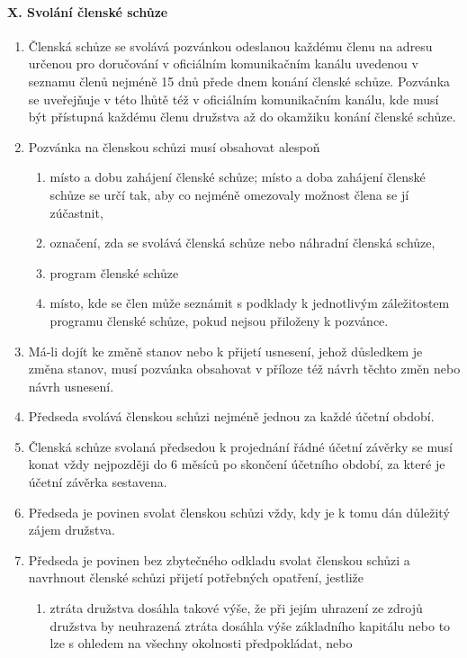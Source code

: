 \paragraph{X. Svolání členské schůze}
\begin{enumerate}
    \item Členská schůze se svolává pozvánkou odeslanou každému členu na adresu určenou pro doručování v oficiálním komunikačním kanálu uvedenou v seznamu členů nejméně 15 dnů přede dnem konání členské schůze. Pozvánka se uveřejňuje v této lhůtě též v oficiálním komunikačním kanálu, kde musí být přístupná každému členu družstva až do okamžiku konání členské schůze.
    \item Pozvánka na členskou schůzi musí obsahovat alespoň
    \begin{enumerate}[label=\alph*.]
        \item místo a dobu zahájení členské schůze; místo a doba zahájení členské schůze se určí tak, aby co nejméně omezovaly možnost člena se jí zúčastnit,
        \item označení, zda se svolává členská schůze nebo náhradní členská schůze,
        \item program členské schůze
        \item místo, kde se člen může seznámit s podklady k jednotlivým záležitostem programu členské schůze, pokud nejsou přiloženy k pozvánce.
    \end{enumerate}
    \item Má-li dojít ke změně stanov nebo k přijetí usnesení, jehož důsledkem je změna stanov, musí pozvánka obsahovat v příloze též návrh těchto změn nebo návrh usnesení.
    \item Předseda svolává členskou schůzi nejméně jednou za každé účetní období.
    \item Členská schůze svolaná předsedou k projednání řádné účetní závěrky se musí konat vždy nejpozději do 6 měsíců po skončení účetního období, za které je účetní závěrka sestavena.
    \item Předseda je povinen svolat členskou schůzi vždy, kdy je k tomu dán důležitý zájem družstva.
    \item Předseda je povinen bez zbytečného odkladu svolat členskou schůzi a navrhnout členské schůzi přijetí potřebných opatření, jestliže
    \begin{enumerate}[label=\alph*.]
        \item ztráta družstva dosáhla takové výše, že při jejím uhrazení ze zdrojů družstva by neuhrazená ztráta dosáhla výše základního kapitálu nebo to lze s ohledem na všechny okolnosti předpokládat, nebo

\end{enumerate}
\end{enumerate}
